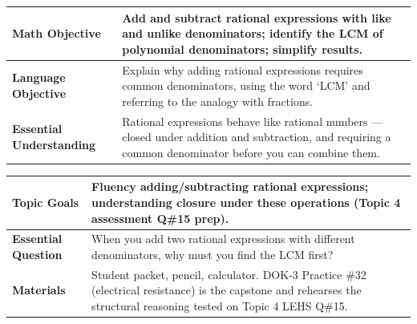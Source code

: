 \documentclass[11pt]{article}
\begin{document}

{\small
\renewcommand{\arraystretch}{1.25}
\noindent\begin{tabular}{|p{1.8in}|p{4.8in}|}
\hline
\textbf{Math Objective} & Add and subtract rational expressions with like and unlike denominators; identify the LCM of polynomial denominators; simplify results. \\ \hline
\textbf{Language Objective} & Explain why adding rational expressions requires common denominators, using the word `LCM' and referring to the analogy with fractions. \\ \hline
\textbf{Essential Understanding} & Rational expressions behave like rational numbers --- closed under addition and subtraction, and requiring a common denominator before you can combine them. \\ \hline
\end{tabular}
}

{\small
\renewcommand{\arraystretch}{1.25}
\noindent\begin{tabular}{|p{1.8in}|p{4.8in}|}
\hline
\textbf{Topic Goals} & Fluency adding/subtracting rational expressions; understanding closure under these operations (Topic 4 assessment Q\#15 prep). \\ \hline
\textbf{Essential Question} & When you add two rational expressions with different denominators, why must you find the LCM first? \\ \hline
\textbf{Materials} & Student packet, pencil, calculator. DOK-3 Practice \#32 (electrical resistance) is the capstone and rehearses the structural reasoning tested on Topic 4 LEHS Q\#15. \\ \hline
\end{tabular}
}

\end{document}
